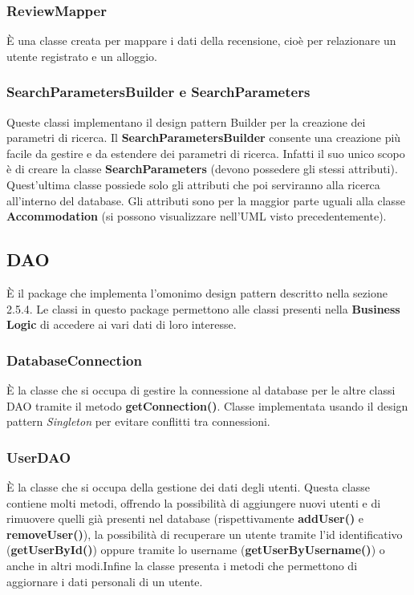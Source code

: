 \documentclass[10pt]{article}
\begin{document}
\subsubsection{ReviewMapper}

\`E una classe creata per mappare i dati della recensione, cioè per relazionare un utente registrato e un alloggio.

\subsubsection{SearchParametersBuilder e SearchParameters}

Queste classi implementano il design pattern Builder per la creazione dei parametri di ricerca. Il \textbf{SearchParametersBuilder} consente una creazione più facile da gestire e da estendere dei parametri di ricerca. Infatti il suo unico scopo è di creare la classe \textbf{SearchParameters} (devono possedere gli stessi attributi). Quest'ultima classe possiede solo gli attributi che poi serviranno alla ricerca all'interno del database. Gli attributi sono per la maggior parte uguali alla classe \textbf{Accommodation} (si possono visualizzare nell'UML visto precedentemente).

\subsection{DAO}

\`E il package che implementa l'omonimo design pattern descritto nella sezione 2.5.4. Le classi in questo package permettono alle classi presenti nella \textbf{Business Logic} di accedere ai vari dati di loro interesse.

\subsubsection{DatabaseConnection}

\`E la classe che si occupa di gestire la connessione al database per le altre classi DAO tramite il metodo \textbf{getConnection()}. Classe implementata usando il design pattern \textit{Singleton} per evitare conflitti tra connessioni.

\subsubsection{UserDAO}

\`E la classe che si occupa della gestione dei dati degli utenti. Questa classe contiene molti metodi, offrendo la possibilità di aggiungere nuovi utenti e di rimuovere quelli già presenti nel database (rispettivamente \textbf{addUser()} e \textbf{removeUser()}), la possibilità di recuperare un utente tramite l'id identificativo (\textbf{getUserById()}) oppure tramite lo username (\textbf{getUserByUsername()}) o anche in altri modi.Infine la classe presenta i metodi che permettono di aggiornare i dati personali di un utente.
\end{document}
